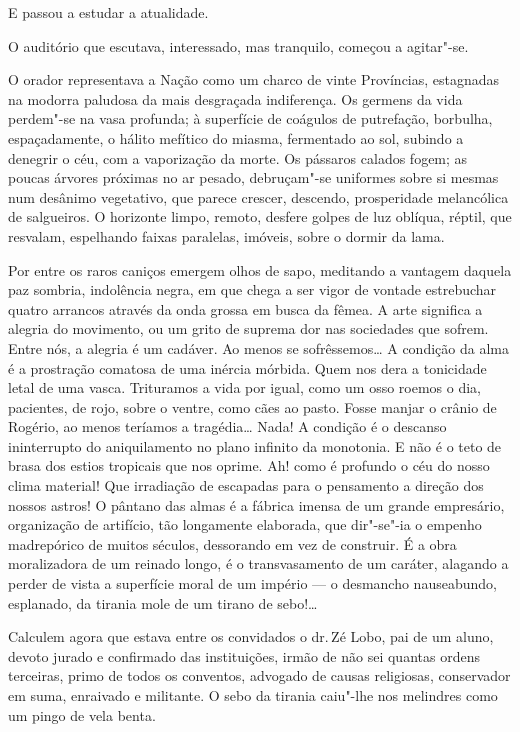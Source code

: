 E passou a estudar a atualidade. 

O auditório que
escutava, interessado, mas tranquilo, começou a agitar"-se. 

O orador
representava a Nação como um charco de vinte Províncias, estagnadas na
modorra paludosa da mais desgraçada indiferença. Os germens da vida
perdem"-se na vasa profunda; à superfície de coágulos de putrefação,
borbulha, espaçadamente, o hálito mefítico do miasma, fermentado ao
sol, subindo a denegrir o céu, com a vaporização da morte. Os pássaros
calados fogem; as poucas árvores próximas no ar pesado, debruçam"-se
uniformes sobre si mesmas num desânimo vegetativo, que parece crescer,
descendo, prosperidade melancólica de salgueiros. O horizonte limpo,
remoto, desfere golpes de luz oblíqua, réptil, que resvalam, espelhando
faixas paralelas, imóveis, sobre o dormir da lama. 

Por entre os raros
caniços emergem olhos de sapo, meditando a vantagem daquela paz
sombria, indolência negra, em que chega a ser vigor de vontade estrebuchar 
quatro arrancos através da onda grossa em busca da fêmea. A arte significa a
alegria do movimento, ou um grito de suprema dor nas sociedades que
sofrem. Entre nós, a alegria é um cadáver. Ao menos se sofrêssemos\ldots{} A
condição da alma é a prostração comatosa de uma inércia mórbida. Quem
nos dera a tonicidade letal de uma vasca. Trituramos a vida por igual, 
como um osso roemos o dia, pacientes, de rojo, sobre o ventre, como
cães ao pasto. Fosse manjar o crânio de Rogério, ao menos teríamos a
tragédia\ldots{} Nada! A condição é o descanso ininterrupto do aniquilamento
no plano infinito da monotonia. E não é o teto de brasa dos estios
tropicais que nos oprime. Ah! como é profundo o céu do nosso clima
material! Que irradiação de escapadas para o pensamento a direção dos
nossos astros! O pântano das almas é a fábrica imensa de um grande
empresário, organização de artifício, tão longamente elaborada, que
dir"-se"-ia o empenho madrepórico de muitos séculos, dessorando em vez
de construir. É a obra moralizadora de um reinado longo, é o
transvasamento de um caráter, alagando a perder de vista a superfície
moral de um império --- o desmancho nauseabundo, esplanado, da tirania
mole de um tirano de sebo!\ldots{} 

Calculem agora que estava entre os
convidados o dr.\,Zé Lobo, pai de um aluno, devoto jurado e confirmado
das instituições, irmão de não sei quantas ordens terceiras, primo de
todos os conventos, advogado de causas religiosas, conservador em suma,
enraivado e militante. O sebo da tirania caiu"-lhe nos melindres como um
pingo de vela benta. 

